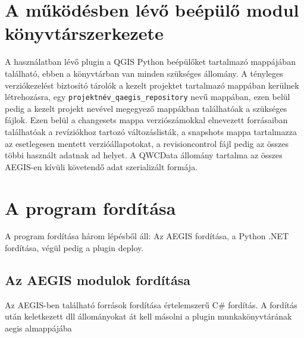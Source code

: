 \section{A működésben lévő beépülő modul könyvtárszerkezete}
A használatban lévő plugin a QGIS Python beépülőket tartalmazó mappájában található, ebben a könyvtárban van minden szükséges állomány. A tényleges verziókezelést biztosító tárolók a kezelt projektet tartalmazó mappában kerülnek létrehozásra, egy \texttt{projektnév\_qaegis\_repository} nevű mappában, ezen belül pedig a kezelt projekt nevével megegyező mappákban találhatóak a szükséges fájlok. Ezen belül a changesets mappa verziószámokkal elnevezett forrásaiban találhatóak a revíziókhoz tartozó változáslisták, a snapshots mappa tartalmazza az esetlegesen mentett verzióállapotokat, a revisioncontrol fájl pedig az összes többi használt adatnak ad helyet. A QWCData állomány tartalma az összes AEGIS-en kívüli követendő adat szerializált formája.

\section{A program fordítása}
A program fordítása három lépésből áll: Az AEGIS fordítása, a Python .NET fordítása, végül pedig a plugin deploy.
\subsection{Az AEGIS modulok fordítása}
Az AEGIS-ben található források fordítása értelemszerű C\# fordítás. A fordítás után keletkezett dll állományokat át kell másolni a plugin munkakönyvtárának aegis almappájába
